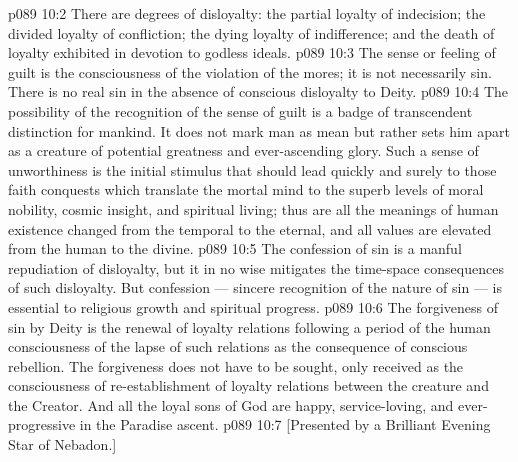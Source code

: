 \vs p089 10:2 \pc {} There are degrees of disloyalty: the partial loyalty of indecision; the divided loyalty of confliction; the dying loyalty of indifference; and the death of loyalty exhibited in devotion to godless ideals.
\vs p089 10:3 \pc The sense or feeling of guilt is the consciousness of the violation of the mores; it is not necessarily sin. There is no real sin in the absence of conscious disloyalty to Deity.
\vs p089 10:4 The possibility of the recognition of the sense of guilt is a badge of transcendent distinction for mankind. It does not mark man as mean but rather sets him apart as a creature of potential greatness and ever\hyp{}ascending glory. Such a sense of unworthiness is the initial stimulus that should lead quickly and surely to those faith conquests which translate the mortal mind to the superb levels of moral nobility, cosmic insight, and spiritual living; thus are all the meanings of human existence changed from the temporal to the eternal, and all values are elevated from the human to the divine.
\vs p089 10:5 The confession of sin is a manful repudiation of disloyalty, but it in no wise mitigates the time\hyp{}space consequences of such disloyalty. But confession --- sincere recognition of the nature of sin --- is essential to religious growth and spiritual progress.
\vs p089 10:6 The forgiveness of sin by Deity is the renewal of loyalty relations following a period of the human consciousness of the lapse of such relations as the consequence of conscious rebellion. The forgiveness does not have to be sought, only received as the consciousness of re\hyp{}establishment of loyalty relations between the creature and the Creator. And all the loyal sons of God are happy, service\hyp{}loving, and ever\hyp{}progressive in the Paradise ascent.
\vsetoff
\vs p089 10:7 [Presented by a Brilliant Evening Star of Nebadon.]
